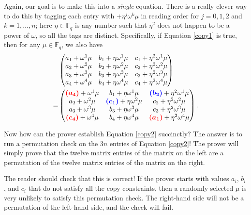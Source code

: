 Again, our goal is to make this into a \emph{single} equation. There is
a really clever way to do this by tagging each entry with
\(+ \eta^{j}\omega^{k}\mu\) in reading order for \(j = 0,1,2\) and
\(k = 1,\ldots,n\); here \(\eta \in {\mathbb{F}}_{q}\) is any number
such that \(\eta^{2}\) does not happen to be a power of \(\omega\), so
all the tags are distinct. Specifically, if
Equation \eqref{copy1} is true, then for any
\(\mu \in {\mathbb{F}}_{q}\), we also have 
\begin{equation}
\label{copy2}
\begin{aligned}
 & \begin{pmatrix}
a_{1} + \omega^{1}\mu & b_{1} + \eta\omega^{1}\mu & c_{1} + \eta^{2}\omega^{1}\mu \\
a_{2} + \omega^{2}\mu & b_{2} + \eta\omega^{2}\mu & c_{2} + \eta^{2}\omega^{2}\mu \\
a_{3} + \omega^{3}\mu & b_{3} + \eta\omega^{3}\mu & c_{3} + \eta^{2}\omega^{3}\mu \\
a_{4} + \omega^{4}\mu & b_{4} + \eta\omega^{4}\mu & c_{4} + \eta^{2}\omega^{4}\mu
\end{pmatrix}  \\
 = & \begin{pmatrix}
\textcolor{red}{\boldsymbol{(a_{4})}} + \omega^{1}\mu & b_{1} + \eta\omega^{1}\mu & \textcolor{blue}{\boldsymbol{(b_{2})}} + \eta^{2}\omega^{1}\mu \\
a_{2} + \omega^{2}\mu & \textcolor{blue}{\boldsymbol{(c_{1})}} + \eta\omega^{2}\mu & c_{2} + \eta^{2}\omega^{2}\mu \\
a_{3} + \omega^{3}\mu & b_{3} + \eta\omega^{3}\mu & c_{3} + \eta^{2}\omega^{3}\mu \\
\textcolor{red}{\boldsymbol{(c_{4})}} + \omega^{4}\mu & b_{4} + \eta\omega^{4}\mu & \textcolor{red}{\boldsymbol{(a_{1})}} + \eta^{2}\omega^{4}\mu
\end{pmatrix}.
\end{aligned}
\end{equation}

Now how can the prover establish Equation \eqref{copy2}
succinctly? The answer is to run a permutation check on the \(3n\)
entries of Equation \eqref{copy2}! The prover will simply prove
that the twelve matrix entries of the matrix on the left are a
permutation of the twelve matrix entries of the matrix on the right.

The reader should check that this is correct! If the prover starts with
values \(a_{i}\), \(b_{i}\), and \(c_{i}\) that do not satisfy all the
copy constraints, then a randomly selected \(\mu\) is very unlikely to
satisfy this permutation check. The right-hand side will not be a
permutation of the left-hand side, and the check will fail.

